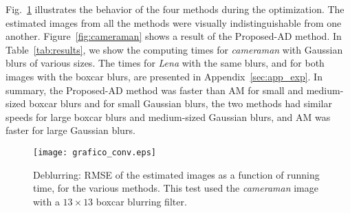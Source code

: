 \documentclass[10pt,twocolumn,twoside]{IEEEtran}
\begin{document}

Fig.~\ref{fig:grafico_conv} illustrates the behavior of the four methods during the optimization. The estimated images from all the methods were visually indistinguishable from one another. Figure~\ref{fig:cameraman} shows a result of the Proposed-AD method. In Table~\ref{tab:results}, we show the computing times for \emph{cameraman} with Gaussian blurs of various sizes. The times for \textit{Lena} with the same blurs, and for both images with the boxcar blurs, are presented in Appendix~\ref{sec:app_exp}. In summary, the Proposed-AD method was faster than AM for small and medium-sized boxcar blurs and for small Gaussian blurs, the two methods had similar speeds for large boxcar blurs and medium-sized Gaussian blurs, and AM was faster for large Gaussian blurs.



\begin{figure}[!t]
	\centering
	\vspace{-6pt}
	\texttt{[image: grafico\_conv.eps]}%
	\vspace{-6pt}
	\caption{Deblurring: RMSE of the estimated images as a function of running time, for the various methods. This test used the \textit{cameraman} image with a $13 \times 13$ boxcar blurring filter.}
	\label{fig:grafico_conv}
\end{figure}
\end{document}
